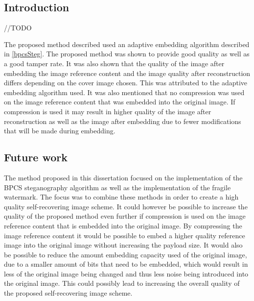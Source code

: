 \documentclass[12pt]{article}
\begin{document}
\subsection{Introduction}
//TODO 

The proposed method described used an adaptive embedding algorithm described in \ref{bpcsSteg}.
The proposed method was shown to provide good quality as well as a good tamper rate.
It was also shown that the quality of the image after embedding the image reference content and the image quality after reconstruction differs depending on the cover image chosen.
This was attributed to the adaptive embedding algorithm used.
It was also mentioned that no compression was used on the image reference content that was embedded into the original image.
If compression is used it may result in higher quality of the image after reconstruction as well as the image after embedding due to fewer modifications that will be made during embedding.

\subsection{Future work}
The method proposed in this dissertation focused on the implementation of the BPCS steganography algorithm as well as the implementation of the fragile watermark. The focus was to combine these methods in order to create a high quality self-recovering image scheme.
It could however be possible to increase the quality of the proposed method even further if compression is used on the image reference content that is embedded into the original image.
By compressing the image reference content it would be possible to embed a higher quality reference image into the original image without increasing the payload size.
It would also be possible to reduce the amount embedding capacity used of the original image, due to a smaller amount of bits that need to be embedded, which would result in less of the original image being changed and thus less noise being introduced into the original image.
This could possibly lead to increasing the overall quality of the proposed self-recovering image scheme.



\end{document}
